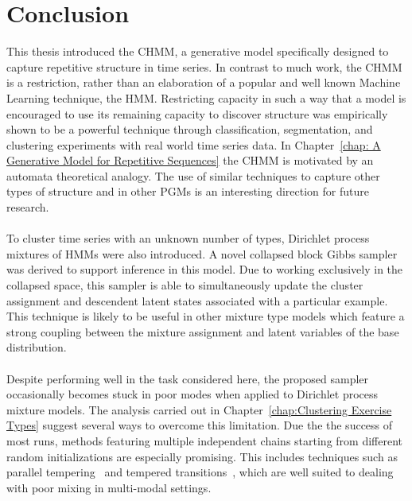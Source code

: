 \documentclass[12pt]{report}
\newcommand{\1}[0]{\mathbbm{1}}
\begin{document}
\chapter{Conclusion}
\label{chap:Conclusion}
This thesis introduced the \ac{CHMM}, a generative model specifically designed to
capture repetitive structure in time series. In contrast to much work, the \ac{CHMM}
is a restriction, rather than an elaboration of a popular and well known Machine Learning
technique, the \ac{HMM}. Restricting capacity in such a way that a model is encouraged to use
its remaining capacity to discover structure was empirically shown to be a powerful technique
through classification, segmentation, and clustering experiments with real world time series data.
In Chapter~\ref{chap: A Generative Model for Repetitive Sequences} the \ac{CHMM} is motivated
by an automata theoretical analogy. The use of similar techniques to capture other types of
structure and in other \acp{PGM} is an interesting direction for future research.
\\\\
To cluster time series with an unknown number of types, Dirichlet process mixtures of \acp{HMM}
were also introduced. A novel collapsed block Gibbs sampler was derived to support inference in this model.
Due to working exclusively in the collapsed space, this sampler is able to simultaneously update the
cluster assignment and descendent latent states associated with a particular example. This technique is likely to be
useful in other mixture type models which feature a strong coupling between the mixture assignment
and latent variables of the base distribution.
\\\\
Despite performing well in the task considered here, the proposed sampler occasionally becomes stuck
in poor modes when applied to Dirichlet process mixture models. The analysis carried out in
Chapter~\ref{chap:Clustering Exercise Types} suggest several ways to overcome this limitation.
Due the the success of most runs, methods featuring multiple independent chains starting from
different random initializations are especially promising. This includes techniques such
as parallel tempering~\cite{learn-neighbor-mcmc} and tempered transitions~\cite{neal-tempered},
which are well suited to dealing with poor mixing in multi-modal settings.



\end{document}

